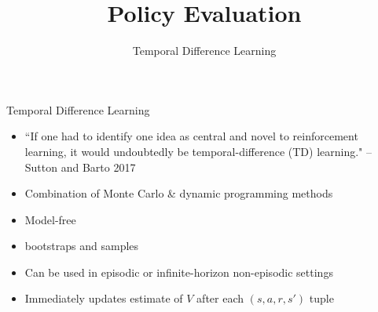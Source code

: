 \documentclass[aspectratio=169]{../latex_main/tntbeamer}  %
\title[Reinforcement Learning: Policy Evaluation]{Policy Evaluation}
\subtitle{Temporal Difference Learning}
\begin{document}
	
	\maketitle


\begin{frame}[c]{Temporal Difference Learning}
	\begin{itemize}
		\item ``If one had to identify one idea as central and novel to reinforcement learning, it would undoubtedly be temporal-difference (TD) learning." -- Sutton and Barto 2017
		\item Combination of Monte Carlo \& dynamic programming methods
		\item Model-free
		\item \alert{bootstraps and samples}
		\item Can be used in episodic or infinite-horizon non-episodic settings
		\item Immediately updates estimate of $V$ after each $(s,a,r,s')$ tuple
	\end{itemize}
	
\end{frame}
\end{document}
